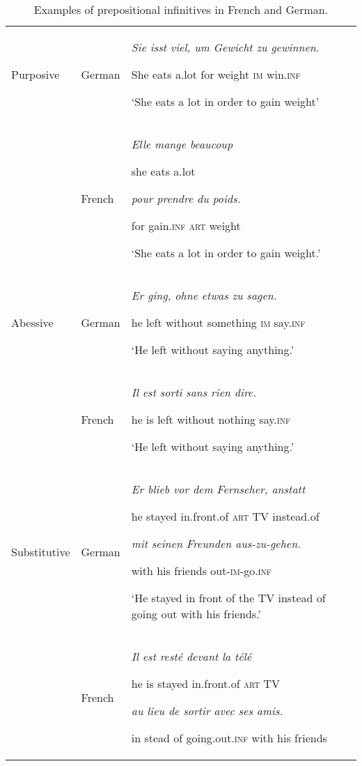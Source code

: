\documentclass[output=paper]{langscibook}
\begin{document}
\begin{table}
\caption{Examples of prepositional infinitives in French and German.}
\label{tab:kalm:1}


\begin{tabularx}{\textwidth}{p{2cm}lQ}

\lsptoprule

Purposive & German & \textit{Sie   isst   viel,   um   Gewicht   zu   gewinnen.} 

She  eats  a.lot   for   weight     \textsc{im}   win.\textsc{inf}

‘She eats a lot in order to gain weight’\\
& French & \textit{Elle   mange   beaucoup} 

she   eats   a.lot

\textit{pour   prendre   du   poids.}

for   gain.\textsc{inf}   \textsc{art}   weight 

‘She eats a lot in order to gain weight.’\\

\tablevspace
Abessive & German & \textit{Er   ging,   ohne     etwas     zu   sagen.}

he   left   without   something   \textsc{im}   say.\textsc{inf}

‘He left without saying anything.’\\
& French & \textit{Il   est   sorti   sans     rien     dire.} 

he   is   left   without   nothing   say.\textsc{inf}

‘He left without saying anything.’\\

\tablevspace
Substitutive & German & \textit{Er   blieb   vor     dem   Fernseher,   anstatt} 

he   stayed   in.front.of   \textsc{art}   TV     instead.of

\textit{mit   seinen   Freunden   aus-zu-gehen.} 

with   his   friends   out-\textsc{im}{}-go.\textsc{inf}

‘He stayed in front of the TV instead of going out with his friends.’\\
& French & \textit{Il   est   resté   devant     la   télé} 

he   is   stayed   in.front.of   \textsc{art}   TV 

\textit{au   lieu   de   sortir     avec   ses   amis.} 

in   stead   of   going.out.\textsc{inf}    with   his   friends


\end{tabularx}
\end{table}
\end{document}
